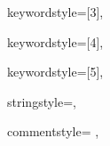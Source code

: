 {%
keywordstyle=[3]{\ttfamily\color{lightblue}},

keywordstyle=[4]{\ttfamily\color{dkblue}},

keywordstyle=[5]{\ttfamily\color{red}},


stringstyle=\ttfamily,

commentstyle={\ttfamily\footnotesize
              },

}

